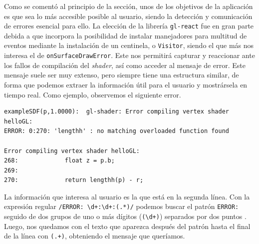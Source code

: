 Como se comentó al principio de la sección, unos de los objetivos de la aplicación es que sea lo más accesible posible al usuario, siendo la detección y comunicación de errores esencial para ello. La elección de la librería \texttt{gl-react} fue en gran parte debida a que incorpora la posibilidad de instalar manejadores para multitud de eventos mediante la instalación de un centinela, o \texttt{Visitor}, siendo el que más nos interesa el de \texttt{onSurfaceDrawError}. Este nos permitirá  capturar y reaccionar ante los fallos de compilación del \textit{shader}, así como acceder al mensaje de error. Este mensaje suele ser muy extenso, pero siempre tiene una estructura similar, de forma que podemos extraer la información útil para el usuario y mostrársela en tiempo real. Como ejemplo, observemos el siguiente error.
\begin{lstlisting}
exampleSDF(p,1.0000):  gl-shader: Error compiling vertex shader helloGL:
ERROR: 0:270: 'lengthh' : no matching overloaded function found

Error compiling vertex shader helloGL:
268:             float z = p.b;
269:       
270:             return lengthh(p) - r;
\end{lstlisting}
La información que interesa al usuario es la que está en la segunda línea. Con la expresión regular \texttt{/ERROR: \textbackslash d+:\textbackslash d+:(.*)/} podemos buscar el patrón \texttt{ERROR:} seguido de dos grupos de uno o más dígitos (\texttt{(\textbackslash d+)}) separados por dos puntos . Luego, nos quedamos con el texto que aparezca después del patrón hasta el final de la línea con \texttt{(.+)}, obteniendo el mensaje que queríamos.\newline

